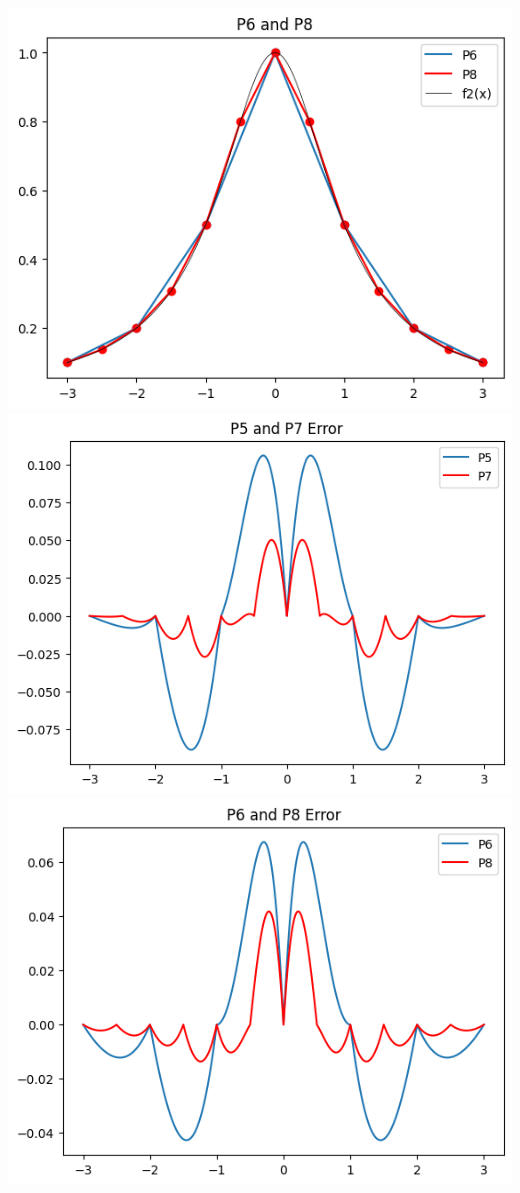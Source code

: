 \documentclass[12pt,twoside]{amsart}
\begin{document}
\begin{enumerate}
\begin{enumerate}
\begin{paracol}{2}
            \includegraphics[scale=0.45]{../img/problem7P6P8.png}
        \switchcolumn
            \includegraphics[scale=0.45]{../img/problem7P5P7error.png} \\
            \includegraphics[scale=0.45]{../img/problem7P6P8error.png}
        \end{paracol}
    \end{enumerate}
    \bigskip


\end{enumerate}
\end{document}
